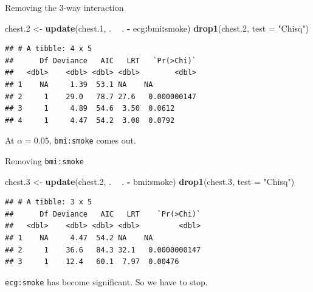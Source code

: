 \documentclass[
  ignorenonframetext,
]{beamer}
\newenvironment{Shaded}{\begin{snugshade}}{\end{snugshade}}
\newcommand{\DataTypeTok}[1]{\textcolor[rgb]{0.13,0.29,0.53}{#1}}
\newcommand{\FloatTok}[1]{\textcolor[rgb]{0.00,0.00,0.81}{#1}}
\newcommand{\KeywordTok}[1]{\textcolor[rgb]{0.13,0.29,0.53}{\textbf{#1}}}
\newcommand{\NormalTok}[1]{#1}
\newcommand{\OperatorTok}[1]{\textcolor[rgb]{0.81,0.36,0.00}{\textbf{#1}}}
\newcommand{\StringTok}[1]{\textcolor[rgb]{0.31,0.60,0.02}{#1}}
\begin{document}
\begin{frame}[fragile]{Removing the 3-way interaction}
\protect\hypertarget{removing-the-3-way-interaction}{}

\small

\begin{Shaded}
\begin{Highlighting}[]
\NormalTok{chest}\FloatTok{.2}\NormalTok{ <-}\StringTok{ }\KeywordTok{update}\NormalTok{(chest}\FloatTok{.1}\NormalTok{, . }\OperatorTok{~}\StringTok{ }\NormalTok{. }\OperatorTok{-}\StringTok{ }\NormalTok{ecg}\OperatorTok{:}\NormalTok{bmi}\OperatorTok{:}\NormalTok{smoke)}
\KeywordTok{drop1}\NormalTok{(chest}\FloatTok{.2}\NormalTok{, }\DataTypeTok{test =} \StringTok{"Chisq"}\NormalTok{)}
\end{Highlighting}
\end{Shaded}

\begin{verbatim}
## # A tibble: 4 x 5
##      Df Deviance   AIC   LRT   `Pr(>Chi)`
##   <dbl>    <dbl> <dbl> <dbl>        <dbl>
## 1    NA     1.39  53.1 NA    NA          
## 2     1    29.0   78.7 27.6   0.000000147
## 3     1     4.89  54.6  3.50  0.0612     
## 4     1     4.47  54.2  3.08  0.0792
\end{verbatim}

\normalsize

At \(\alpha=0.05\), \texttt{bmi:smoke} comes out.

\end{frame}

\begin{frame}[fragile]{Removing \texttt{bmi:smoke}}
\protect\hypertarget{removing-bmismoke}{}

\small

\begin{Shaded}
\begin{Highlighting}[]
\NormalTok{chest}\FloatTok{.3}\NormalTok{ <-}\StringTok{ }\KeywordTok{update}\NormalTok{(chest}\FloatTok{.2}\NormalTok{, . }\OperatorTok{~}\StringTok{ }\NormalTok{. }\OperatorTok{-}\StringTok{ }\NormalTok{bmi}\OperatorTok{:}\NormalTok{smoke)}
\KeywordTok{drop1}\NormalTok{(chest}\FloatTok{.3}\NormalTok{, }\DataTypeTok{test =} \StringTok{"Chisq"}\NormalTok{)}
\end{Highlighting}
\end{Shaded}

\begin{verbatim}
## # A tibble: 3 x 5
##      Df Deviance   AIC   LRT    `Pr(>Chi)`
##   <dbl>    <dbl> <dbl> <dbl>         <dbl>
## 1    NA     4.47  54.2 NA    NA           
## 2     1    36.6   84.3 32.1   0.0000000147
## 3     1    12.4   60.1  7.97  0.00476
\end{verbatim}

\normalsize

\texttt{ecg:smoke} has become significant. So we have to stop.

\end{frame}
\end{document}
